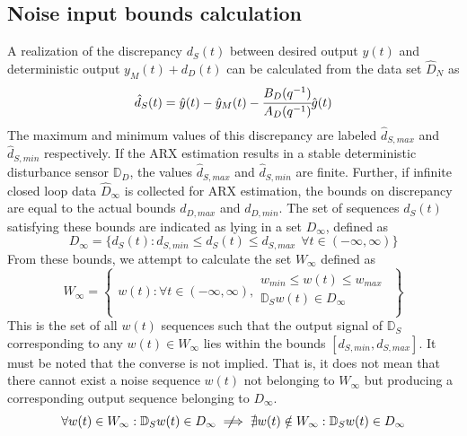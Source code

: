 \documentclass[letterpaper, 10 pt, conference]{ieeeconf}  %
\newcommand{\notimplies}{%
	\mathrel{{\ooalign{\hidewidth$\not\phantom{=}$\hidewidth\cr$\implies$}}}}
\begin{document}
\begin{enumerate}
	\section{Noise input bounds calculation}
	\label{Noise}
	A realization of the discrepancy $d_S(t)$ between desired output $y(t)$ and deterministic output $y_M(t)+d_D(t)$ can be calculated from the data set $\hat{D}_{N}$ as 
	\begin{equation*}
	\hat{d}_S(t) = \hat{y}(t)-\hat{y}_M(t)-\cfrac{B_D(q^{-1})}{A_D(q^{-1})} \hat{g}(t) 
	\end{equation*}
	The maximum and minimum values of this discrepancy are labeled $\hat{d}_{S,max}$ and $\hat{d}_{S,min}$ respectively. If the ARX estimation results in a stable deterministic disturbance sensor $\mathbb{D}_D$, the values $\hat{d}_{S,max}$ and $\hat{d}_{S,min}$ are finite. Further, if infinite closed loop data $\hat{D}_{\infty}$ is collected for ARX estimation, the bounds on discrepancy are equal to the actual bounds $d_{D,max}$ and $d_{D,min}$. The set of sequences $d_S(t)$ satisfying these bounds are indicated as lying in a set $D_{\infty}$, defined as 
	\begin{equation*}
	D_{\infty} = \{d_S(t): d_{S,min} \leq d_S(t) \leq d_{S,max} \hspace{5pt} \forall t \in (-\infty,\infty) \}
	\end{equation*}
	 From these bounds, we attempt to calculate the set $W_{\infty}$ defined as
	\begin{equation*}
	W_{\infty} = \begin{Bmatrix} w(t): \forall t \in (-\infty,\infty), \begin{matrix}
	w_{min}\leq w(t)\leq w_{max} \\ 
	\mathbb{D}_S w(t) \in D_{\infty} \\
	\end{matrix} 
	\end{Bmatrix}
	\end{equation*}  
	This is the set of all $w(t)$ sequences such that the output signal of $\mathbb{D}_S$ corresponding to any $w(t)\in W_{\infty}$  lies within the bounds $[d_{S,min},d_{S,max}]$. It must be noted that the converse is not implied. That is, it does not mean that there cannot exist a noise sequence $w(t)$ not belonging to $W_{\infty}$ but producing a corresponding output sequence belonging to $D_{\infty}$.
	\begin{equation*}
	\forall w(t) \in W_{\infty}  : \mathbb{D}_S w(t) \in D_{\infty} \notimplies \nexists  w(t) \notin W_{\infty} : \mathbb{D}_S w(t) \in D_{\infty}

\end{equation*}
\end{enumerate}
\end{document}
